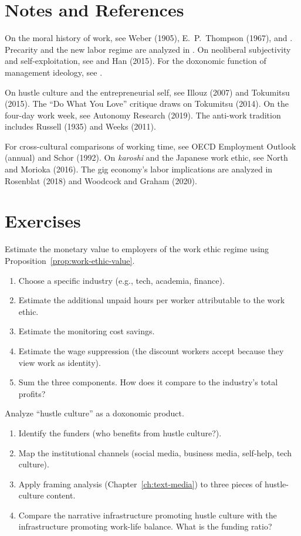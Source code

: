\section{Notes and References}
\label{sec:ch26-notes}

On the moral history of work, see Weber (1905), E.\ P.\ Thompson (1967), and \textcite{sennett1998}.
Precarity and the new labor regime are analyzed in \textcite{standing2011}.
On neoliberal subjectivity and self-exploitation, see \textcite{brown2015} and Han (2015).
For the doxonomic function of management ideology, see \textcite{bourdieu1991}.

On hustle culture and the entrepreneurial self, see Illouz (2007) and Tokumitsu (2015).
The ``Do What You Love'' critique draws on Tokumitsu (2014).
On the four-day work week, see Autonomy Research (2019).
The anti-work tradition includes Russell (1935) and Weeks (2011).

For cross-cultural comparisons of working time, see OECD Employment Outlook (annual) and Schor (1992).
On \emph{karoshi} and the Japanese work ethic, see North and Morioka (2016).
The gig economy's labor implications are analyzed in Rosenblat (2018) and Woodcock and Graham (2020).

\section{Exercises}

\begin{exercise}
Estimate the monetary value to employers of the work ethic regime using Proposition~\ref{prop:work-ethic-value}.
\begin{enumerate}[nosep]
  \item Choose a specific industry (e.g., tech, academia, finance).
  \item Estimate the additional unpaid hours per worker attributable to the work ethic.
  \item Estimate the monitoring cost savings.
  \item Estimate the wage suppression (the discount workers accept because they view work as identity).
  \item Sum the three components. How does it compare to the industry's total profits?
\end{enumerate}
\end{exercise}

\begin{exercise}
Analyze ``hustle culture'' as a doxonomic product.
\begin{enumerate}[nosep]
  \item Identify the funders (who benefits from hustle culture?).
  \item Map the institutional channels (social media, business media, self-help, tech culture).
  \item Apply framing analysis (Chapter~\ref{ch:text-media}) to three pieces of hustle-culture content.
  \item Compare the narrative infrastructure promoting hustle culture with the infrastructure promoting work-life balance. What is the funding ratio?
\end{enumerate}
\end{exercise}

